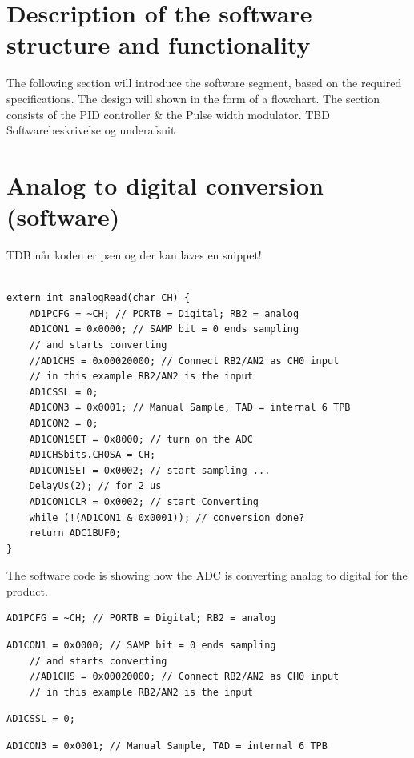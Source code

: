 \section{Description of the software structure and functionality}

The following section will introduce the software segment, based on the required specifications. The design will shown in the form of a flowchart.
The section consists of the PID controller \& the Pulse width modulator.
TBD Softwarebeskrivelse og underafsnit

\section{Analog to digital conversion (software)}

TDB når koden er pæn og der kan laves en snippet!
\begin{lstlisting}

extern int analogRead(char CH) {
    AD1PCFG = ~CH; // PORTB = Digital; RB2 = analog
    AD1CON1 = 0x0000; // SAMP bit = 0 ends sampling
    // and starts converting
    //AD1CHS = 0x00020000; // Connect RB2/AN2 as CH0 input
    // in this example RB2/AN2 is the input
    AD1CSSL = 0;
    AD1CON3 = 0x0001; // Manual Sample, TAD = internal 6 TPB
    AD1CON2 = 0;
    AD1CON1SET = 0x8000; // turn on the ADC
    AD1CHSbits.CH0SA = CH;
    AD1CON1SET = 0x0002; // start sampling ...
    DelayUs(2); // for 2 us
    AD1CON1CLR = 0x0002; // start Converting
    while (!(AD1CON1 & 0x0001)); // conversion done?
    return ADC1BUF0;	
}
\end{lstlisting}
The software code is showing how the ADC is converting analog to digital for the product.
\begin{lstlisting}
AD1PCFG = ~CH; // PORTB = Digital; RB2 = analog
\end{lstlisting}

\begin{lstlisting}
AD1CON1 = 0x0000; // SAMP bit = 0 ends sampling
    // and starts converting
    //AD1CHS = 0x00020000; // Connect RB2/AN2 as CH0 input
    // in this example RB2/AN2 is the input
\end{lstlisting}

\begin{lstlisting}
AD1CSSL = 0;
\end{lstlisting}

\begin{lstlisting}
AD1CON3 = 0x0001; // Manual Sample, TAD = internal 6 TPB
\end{lstlisting}


